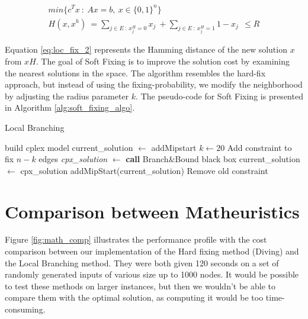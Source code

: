 \begin{align}[H]
    min\{c^Tx\ : \ Ax=b,\ x \in \{0,1\}^n\} \label{eq:loc_fix_2} \\[2em]
    H(x,x^h)\ = \sum_{j \in E\ :\ x_{j}^{H}=0} x_j\ + \sum_{j \in E\ :\ x_{j}^{H}=1} 1 - x_j\ \ \leq R \label{eq:loc_fix_2}
\end{align}

Equation \ref{eq:loc_fix_2} represents the Hamming distance of the new solution \(x\) from \(xH\). The goal of Soft Fixing is to improve the solution cost by examining the nearest solutions in the space. The algorithm resembles the hard-fix approach, but instead of using the fixing-probability, we modify the neighborhood by adjusting the radius parameter \(k\). The pseudo-code for Soft Fixing is presented in Algorithm \ref{alg:soft_fixing_algo}.\\

\begin{algorithm}[H]
    \caption{Local Branching}
    \label{alg:soft_fixing_algo}
    \begin{spacing}{1.2} %
        \BlankLine
        build cplex model\;
        current\_solution $\leftarrow$ addMipstart\;
        $k \leftarrow 20$\;
        \BlankLine
        {
            Add constraint to fix $n-k$ edges\;
            \BlankLine
            \textit{cpx\_solution} $\leftarrow$ \textbf{call} Branch\&Bound black box\;
            \BlankLine
            {
                current\_solution $\leftarrow$ cpx\_solution\;
                addMipStart(current\_solution)\;
            }
            \BlankLine
            Remove old constraint\;
        }
    \end{spacing}
\end{algorithm}

\newpage

\section{Comparison between Matheuristics}
Figure \ref{fig:math_comp} illustrates the performance profile with the cost comparison between our implementation of the Hard fixing method (Diving) and the Local Branching method. 
They were both given 120 seconds on a set of randomly generated inputs of various size up to 1000 nodes. It would be possible to test these methods on larger instances, but then we wouldn't be able to compare them with the optimal solution, as computing it would be too time-consuming.

